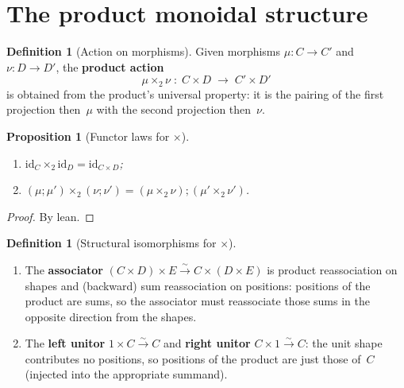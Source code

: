 \documentclass[11pt,a4paper]{article}
\theoremstyle{plain}
\newtheorem{proposition}[theorem]{Proposition}
\theoremstyle{definition}
\newtheorem{definition}[theorem]{Definition}
\newcommand{\id}{\mathrm{id}}
\begin{document}
\section{The product monoidal structure}

\begin{definition}[Action on morphisms]\label{def:prod2}
Given morphisms $\mu : C \to C'$ and $\nu : D \to D'$, the
\textbf{product action}
\[
  \mu \times_2 \nu \;:\; C \times D \;\longrightarrow\; C' \times D'
\]
is obtained from the product's universal property: it is the pairing of
the first projection then~$\mu$ with the second projection then~$\nu$.
\end{definition}

\begin{proposition}[Functor laws for $\times$]\label{prop:prod2-laws}
\begin{enumerate}
  \item $\id_C \times_2 \id_D = \id_{C \times D}$;
  \item $(\mu \mathbin{;}\mu') \times_2 (\nu \mathbin{;}\nu')
        = (\mu \times_2 \nu) \mathbin{;} (\mu' \times_2 \nu')$.
\end{enumerate}
\end{proposition}

\begin{proof}
By lean.
\end{proof}

\begin{definition}[Structural isomorphisms for $\times$]\label{def:prod-struct}
\begin{enumerate}
  \item The \textbf{associator}
        $(C \times D) \times E \xrightarrow{\sim} C \times (D \times E)$
        is product reassociation on shapes and (backward) sum
        reassociation on positions: positions of the product are sums,
        so the associator must reassociate those sums in the opposite
        direction from the shapes.
  \item The \textbf{left unitor} $1 \times C \xrightarrow{\sim} C$ and
        \textbf{right unitor} $C \times 1 \xrightarrow{\sim} C$: the
        unit shape contributes no positions, so positions of the product
        are just those of~$C$ (injected into the appropriate summand).
\end{enumerate}
\end{definition}
\end{document}
